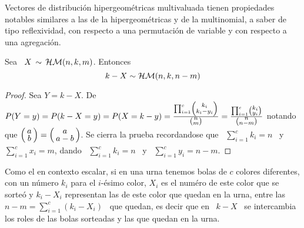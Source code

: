 Vectores  de  distribuci\'on  hipergeom\'etricas multivaluada  tienen  propiedades
notables similares a las de la  hipergeom\'etricas y de la multinomial, a saber de
tipo reflexividad, con respecto a una permutaci\'on de variable y con respecto a
una agregaci\'on.
%
\begin{lema}[Reflexividad]
\label{Lem:MP:ReflexividadHipergeomMulti}
%
  Sea \ $X \, \sim \, \mathcal{H}\mathcal{M}(n,k,m)$. Entonces
  \[
  k-X \sim \mathcal{H}\mathcal{M}(n,k,n-m)
  \]
\end{lema}
%
\begin{proof}
  Sea $Y =  k-X$. De $P(Y = y) =  P(k-X = y) = P(X  = k-y) = \frac{\prod_{i=1}^c
    \smallbino{k_i}{k_i-y_i}}{\smallbino{n}{m}}       =      \frac{\prod_{i=1}^c
    \smallbino{k_i}{y_i}}{\smallbino{n}{n-m}}$   notando   que  $\bino{a}{b}   =
  \bino{a}{a-b}$. Se cierra la prueba  recordandose que \ $\sum_{i=1}^c k_i = n$
  \  y  \ $\sum_{i=1}^c  x_i  =  m$,  dando \  $\sum_{i=1}^c  k_i  =  n$ \  y  \
  $\sum_{i=1}^c y_i = n-m$.
\end{proof}
%
Como  el en  contexto  escalar, si  en una  urna  tenemos bolas  de $c$  colores
diferentes,  con  un n\'umero  $k_i$  para el  $i$-\'esimo  color,  $X_i$ es  el
num\'ero de este color que se sorte\'o y $k_i-X_i$ representan las de este color
que quedan en la urna, entre las  \ $n-m = \sum_{i=1}^c (k_i-X_i)$ \ que quedan,
es decir que en \ $k-X$ \ se  intercambia los roles de las bolas sorteadas y las
que quedan en la urna.

